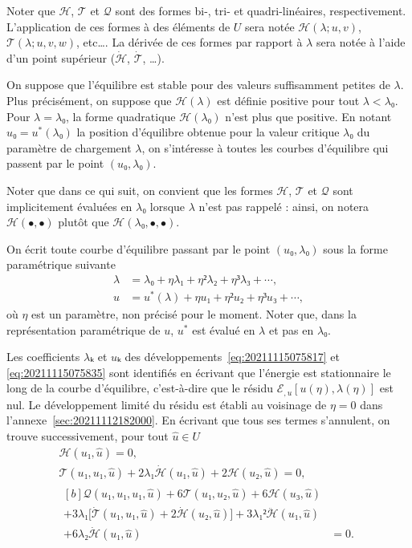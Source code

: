 \documentclass[12pt, final]{amsart}
\begin{document}
Noter que \(ℋ\), \(𝒯\) et \(𝒬\) sont des formes bi-, tri- et quadri-linéaires,
respectivement. L'application de ces formes à des éléments de \(U\) sera notée
\(ℋ(λ; u, v)\), \(𝒯(λ; u, v, w)\), etc\dots. La dérivée de ces formes par
rapport à \(λ\) sera notée à l'aide d'un point supérieur (\(\dot{ℋ}\),
\(\dot{𝒯}\), \dots).

On suppose que l'équilibre est stable pour des valeurs suffisamment petites de
\(λ\). Plus précisément, on suppose que \(ℋ(λ)\) est définie positive pour tout
\(λ<λ₀\). Pour \(λ=λ₀\), la forme quadratique \(ℋ(λ₀)\) n'est plus que
positive. En notant \(u₀=u^*(λ₀)\) la position d'équilibre obtenue pour la
valeur critique \(λ₀\) du paramètre de chargement \(λ\), on s'intéresse à
toutes les courbes d'équilibre qui passent par le point \((u₀, λ₀)\).

Noter que dans ce qui suit, on convient que les formes \(ℋ\), \(𝒯\) et \(𝒬\)
sont implicitement évaluées en \(λ₀\) lorsque \(λ\) n'est pas rappelé : ainsi,
on notera \(ℋ(•, •)\) plutôt que \(ℋ(λ₀, •, •)\).

On écrit toute courbe d'équilibre passant par le point \((u₀, λ₀)\) sous la
forme paramétrique suivante
\begin{align}
  \label{eq:20211115075817}
  λ&=λ₀+ηλ₁+η²λ₂+η³λ₃+\cdots,\\
  \label{eq:20211115075835}
  u&=u^*(λ)+η u₁+η² u₂+η³u₃+\cdots,
\end{align}
où \(η\) est un paramètre, non précisé pour le moment. Noter que, dans la
représentation paramétrique de \(u\), \(u^*\) est évalué en \(λ\) et pas en
\(λ₀\).

Les coefficients \(λ ₖ\) et \(uₖ\) des développements~\eqref{eq:20211115075817}
et \eqref{eq:20211115075835} sont identifiés en écrivant que l'énergie est
stationnaire le long de la courbe d'équilibre, c'est-à-dire que le résidu
\(ℰ_{,u}[u(η), λ(η)]\) est nul. Le développement limité du résidu est établi au
voisinage de \(η=0\) dans l'annexe~\ref{sec:20211112182000}. En écrivant que
tous ses termes s'annulent, on trouve successivement, pour tout \(\hat{u}∈ U\)
\begin{gather}
  \label{eq:20211112182917}
  ℋ(u₁, \hat{u})=0,\\
  \label{eq:20211112183220}
  𝒯(u₁, u₁, \hat{u})+2λ₁\dot{ℋ}(u₁, \hat{u})+2ℋ(u₂, \hat{u})=0,\\
  \begin{aligned}[b]
    𝒬(u₁, u₁, u₁, \hat{u})+6𝒯(u₁, u₂, \hat{u})+6ℋ(u₃, \hat{u})&\\
    +3λ₁\bigl[\dot{𝒯}(u₁, u₁, \hat{u})+2\dot{ℋ}(u₂, \hat{u})\bigr]
    +3λ₁²\ddot{ℋ}(u₁, \hat{u})&\\
    +6λ₂\dot{ℋ}(u₁, \hat{u})&=0.
  \end{aligned}
\end{gather}
\end{document}
